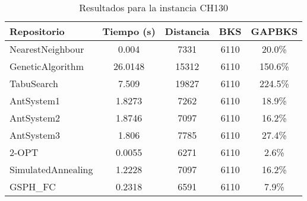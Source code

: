 \begin{table}[H]
\centering
\caption{Resultados para la instancia CH130}
\begin{tabular}{|l|c|c|c|c|}
\hline
\textbf{Repositorio} & \textbf{Tiempo (s)} & \textbf{Distancia} & \textbf{BKS} & \textbf{GAPBKS} \\ 
\hline
NearestNeighbour & 0.004 & 7331 & 6110 & 20.0\% \\ 
GeneticAlgorithm & 26.0148 & 15312 & 6110 & 150.6\% \\ 
TabuSearch & 7.509 & 19827 & 6110 & 224.5\% \\ 
AntSystem1 & 1.8273 & 7262 & 6110 & 18.9\% \\ 
AntSystem2 & 1.8746 & 7097 & 6110 & 16.2\% \\ 
AntSystem3 & 1.806 & 7785 & 6110 & 27.4\% \\ 
2-OPT & 0.0055 & 6271 & 6110 & 2.6\% \\ 
SimulatedAnnealing & 1.2228 & 7097 & 6110 & 16.2\% \\ 
GSPH_FC & 0.2318 & 6591 & 6110 & 7.9\% \\ 
\hline
\end{tabular}
\end{table}
